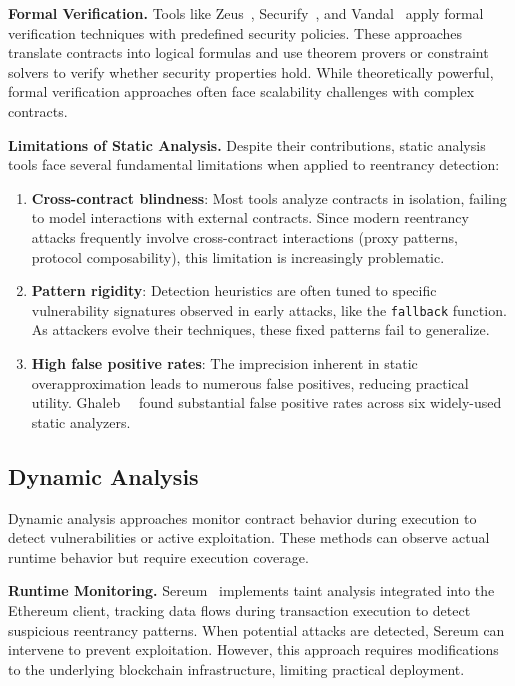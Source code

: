 \textbf{Formal Verification.} Tools like Zeus~\cite{zeus}, Securify~\cite{securify}, and Vandal~\cite{vandal} apply formal verification techniques with predefined security policies. These approaches translate contracts into logical formulas and use theorem provers or constraint solvers to verify whether security properties hold. While theoretically powerful, formal verification approaches often face scalability challenges with complex contracts.

\textbf{Limitations of Static Analysis.} Despite their contributions, static analysis tools face several fundamental limitations when applied to reentrancy detection:

\begin{enumerate}
    \item \textbf{Cross-contract blindness}: Most tools analyze contracts in isolation, failing to model interactions with external contracts. Since modern reentrancy attacks frequently involve cross-contract interactions (\eg proxy patterns, protocol composability), this limitation is increasingly problematic.

    \item \textbf{Pattern rigidity}: Detection heuristics are often tuned to specific vulnerability signatures observed in early attacks, like the \lstinline{fallback} function. As attackers evolve their techniques, these fixed patterns fail to generalize.

    \item \textbf{High false positive rates}: The imprecision inherent in static overapproximation leads to numerous false positives, reducing practical utility. Ghaleb~\etal~\cite{survey:static-analysis} found substantial false positive rates across six widely-used static analyzers.
\end{enumerate}

\subsection{Dynamic Analysis}
\label{sec:rw-dynamic}

Dynamic analysis approaches monitor contract behavior during execution to detect vulnerabilities or active exploitation. These methods can observe actual runtime behavior but require execution coverage.

\textbf{Runtime Monitoring.} Sereum~\cite{sereum} implements taint analysis integrated into the Ethereum client, tracking data flows during transaction execution to detect suspicious reentrancy patterns. When potential attacks are detected, Sereum can intervene to prevent exploitation. However, this approach requires modifications to the underlying blockchain infrastructure, limiting practical deployment.

